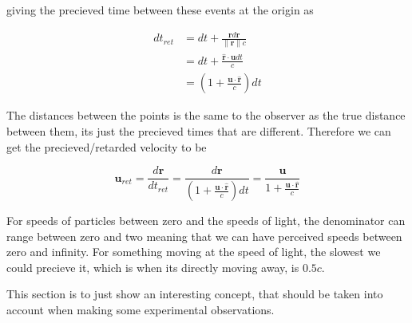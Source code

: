 giving the precieved time between these events at the origin as

\begin{equation}
	\begin{aligned}
		dt_{ret} & =   dt + \frac{\mathbf{r} d\mathbf{r}}{\|\mathbf{r}\| c}               \\
		         & = dt + \frac{\hat{\mathbf{r}} \cdot \mathbf{u} dt}{ c}                 \\
		         & = \left( 1 + \frac{ \mathbf{u} \cdot \hat{\mathbf{r}} }{ c} \right) dt
	\end{aligned}
\end{equation}

The distances between the points is the same to the observer as the true distance between them, its just the precieved times that are different.
Therefore we can get the precieved/retarded velocity to be

\begin{equation}
	\mathbf{u}_{ret} = \frac{d\mathbf{r}}{dt_{ret}} = \frac{d\mathbf{r}}{ \left( 1 + \frac{ \mathbf{u} \cdot \hat{\mathbf{r}} }{ c} \right) dt } = \frac{\mathbf{u}}{ 1 + \frac{ \mathbf{u} \cdot \hat{\mathbf{r}} }{ c} }
\end{equation}

For speeds of particles between zero and the speeds of light, the denominator can range between zero and two meaning that we can have perceived speeds between zero and infinity.
For something moving at the speed of light, the slowest we could precieve it, which is when its directly moving away, is $0.5{c}$.

This section is to just show an interesting concept, that should be taken into account when making some experimental observations.




